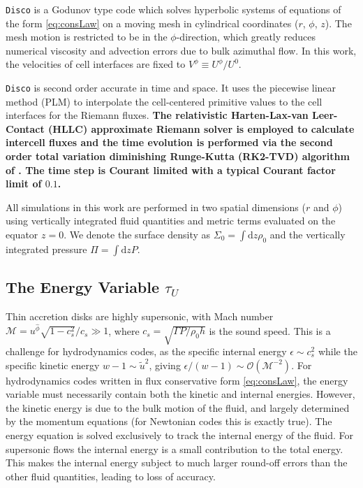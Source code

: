 \documentclass{emulateapj}
\newcommand{\eps}{\epsilon}
\newcommand{\Sig}{\Sigma}
\newcommand{\Mach}{\mathcal{M}}
\newcommand{\dd}{\mbox{d}}
\newcommand{\Disco}{{\texttt{Disco}}}
\newcommand{\OO}{\mathcal{O}}
\begin{document}
\Disco{} is a Godunov type code which solves hyperbolic systems of equations of the form \eqref{eq:consLaw} on a moving mesh in cylindrical coordinates ($r$, $\phi$, $z$).  The mesh motion is restricted to be in the $\phi$-direction, which greatly reduces numerical viscosity and advection errors due to bulk azimuthal flow.  In this work, the velocities of cell interfaces are fixed to $V^\phi \equiv U^\phi/U^0$.   

\Disco{} is second order accurate in time and space.  It uses the piecewise linear method (PLM) to interpolate the cell-centered primitive values to the cell interfaces for the Riemann fluxes.  {\bf The relativistic Harten-Lax-van Leer-Contact (HLLC) approximate Riemann solver \citep{Mignone05} is employed to calculate intercell fluxes and the time evolution is performed via the second order total variation diminishing Runge-Kutta (RK2-TVD) algorithm of \cite{Gottlieb98}.  The time step is Courant limited with a typical Courant factor limit of $0.1$.}

All simulations in this work are performed in two spatial dimensions ($r$ and $\phi$) using vertically integrated fluid quantities and metric terms evaluated on the equator $z=0$.  We denote the surface density as $\Sig_0 = \int \dd z \rho_0$ and the vertically integrated pressure $\Pi = \int \dd z P$.  


\subsection{The Energy Variable $\tau_U$}
\label{subsec:energy}


Thin accretion disks are highly supersonic, with Mach number $\Mach = u^{\hat{\phi}} \sqrt{1-c_s^2}/c_s \gg 1$, where $c_s = \sqrt{\Gamma P / \rho_0 h}$ is the sound speed.  This is a challenge for hydrodynamics codes, as the specific internal energy $\eps \sim c_s^2$ while the specific kinetic energy $w-1 \sim \tilde{u}^2$, giving $\eps / (w-1) \sim \OO(\Mach^{-2})$.  For hydrodynamics codes written in flux conservative form \eqref{eq:consLaw}, the energy variable must necessarily contain both the kinetic and internal energies.  However, the kinetic energy is due to the bulk motion of the fluid, and largely determined by the momentum equations (for Newtonian codes this is exactly true).  The energy equation is solved exclusively to track the internal energy of the fluid. For supersonic flows the internal energy is a small contribution to the total energy.  This makes the internal energy subject to much larger round-off errors than the other fluid quantities, leading to loss of accuracy.
\end{document}
